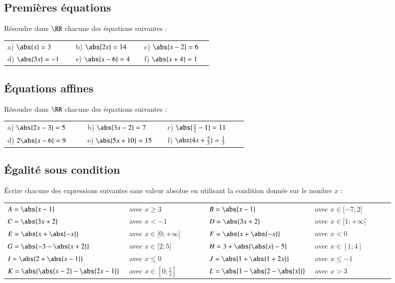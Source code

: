 \documentclass[oneside,12pt]{article}          %
\begin{document}
\subsection{Premières équations}
Résoudre dans $\RR$ chacune des équations suivantes :

\begin{tabular}{p{0.3\linewidth} p{0.3\linewidth} p{0.3\linewidth}}
	a) $\abs{x}=3$ & b) $\abs{2x}=14$ & c) $\abs{x-2}=6$ \\
	d) $\abs{3x}=-1$ & e) $\abs{x-6}=4$ & f) $\abs{x+4}=1$
\end{tabular}



\subsection{Équations affines}
Résoudre dans $\RR$ chacune des équations suivantes :

\begin{tabular}{p{0.3\linewidth} p{0.3\linewidth} p{0.3\linewidth}}
	a) $\abs{2x-3}=5$ & b) $\abs{3x-2}=7$ & c) $\abs{\frac{x}{2}-1}=11$ \\
	d) $2\abs{x-6}=9$ & e) $\abs{5x+10}=15$ & f) $\abs{4x+\frac{5}{3}}=\frac{1}{3}$
\end{tabular}



\subsection{Égalité sous condition}
Écrire chacune des expressions suivantes sans valeur absolue en utilisant la condition donnée sur le nombre $x$ :

\begin{tabular}{P{0.25\linewidth} p{0.2\linewidth} | P{0.25\linewidth} p{0.2\linewidth}}
	$A = \abs{x-1}$ & avec $x\geq3$ & $B = \abs{x-1}$ & avec $x\in[-7;2[$ \\
	$C = \abs{3x+2}$ & avec $x<-1$ & $D = \abs{3x+2}$ & avec $x\in[1;+\infty[$ \\
	$E = \abs{x+\abs{-x}}$ & avec $x\in[0;+\infty[$ & $F = \abs{x+\abs{-x}}$ & avec $x<0$ \\
	$G = \abs{-3-\abs{x+2}}$ & avec $x\in[2;5[$ & $H = 3+\abs{\abs{x}-5}$ & avec $x\in[1;4]$ \\
	$I = \abs{2+\abs{x-1}}$ & avec $x\leq0$ & $J = \abs{1+\abs{1+2x}}$ & avec $x\leq-1$ \\
	$K = \abs{\abs{x-2}-\abs{2x-1}}$ & avec $x\in\left[0;\frac{1}{4}\right]$ & $L = \abs{1-\abs{2-\abs{x}}}$ & 		avec $x>3$
\end{tabular}
\end{document}

